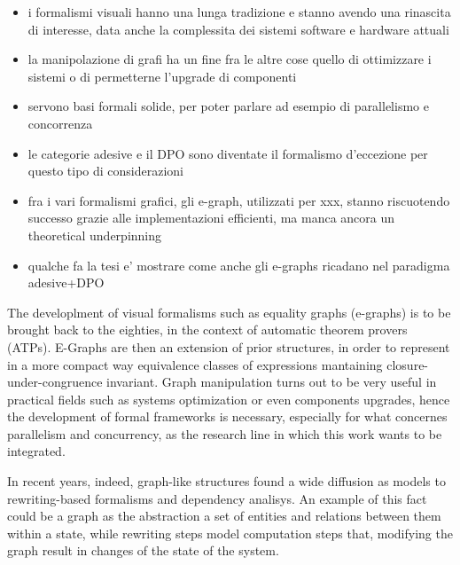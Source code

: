 \begin{itemize}
\item i formalismi visuali hanno una lunga tradizione e stanno avendo una rinascita di interesse, data anche la complessita dei sistemi software e hardware attuali
\item la manipolazione di grafi ha un fine fra le altre cose quello di ottimizzare i sistemi o di permetterne l'upgrade di componenti
\item servono basi formali solide, per poter parlare ad esempio di parallelismo e concorrenza
\item le categorie adesive e il DPO sono diventate il formalismo d'eccezione per questo tipo di considerazioni
\item fra i vari formalismi grafici, gli e-graph, utilizzati per xxx, stanno riscuotendo successo grazie alle implementazioni efficienti, ma manca ancora un theoretical underpinning
\item qualche fa la tesi e' mostrare come anche gli e-graphs ricadano nel paradigma adesive+DPO
\end{itemize}

\fi

The developlment of visual formalisms such as equality graphs (e-graphs) is to be brought back to the eighties, in the context of automatic theorem provers (ATPs).
E-Graphs are then an extension of prior structures, in order to represent in a more compact way equivalence classes of expressions mantaining closure-under-congruence invariant.
Graph manipulation turns out to be very useful in practical fields such as systems optimization or even components upgrades, hence the development of formal frameworks is necessary, especially for what concernes parallelism and concurrency, as the research line in which this work wants to be integrated.

In recent years, indeed, graph-like structures found a wide diffusion as models to rewriting-based formalisms and dependency analisys.
An example of this fact could be a graph as the abstraction a set of entities and relations between them within a state, while rewriting steps model computation steps that, modifying the graph result in changes of the state of the system.

